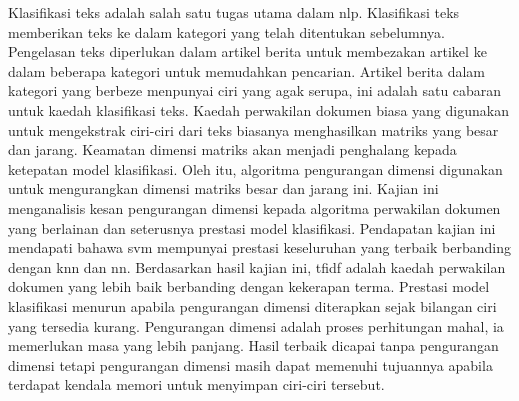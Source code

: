 Klasifikasi teks adalah salah satu tugas utama dalam \ac{nlp}. Klasifikasi teks memberikan teks ke dalam kategori yang telah ditentukan sebelumnya. Pengelasan teks diperlukan dalam artikel berita untuk membezakan artikel ke dalam beberapa kategori untuk memudahkan pencarian. Artikel berita dalam kategori yang berbeze menpunyai ciri yang agak serupa, ini adalah satu cabaran untuk kaedah klasifikasi teks. Kaedah perwakilan dokumen biasa yang digunakan untuk mengekstrak ciri-ciri dari teks biasanya menghasilkan matriks yang besar dan jarang. Keamatan dimensi matriks akan menjadi penghalang kepada ketepatan model klasifikasi. Oleh itu, algoritma pengurangan dimensi digunakan untuk mengurangkan dimensi matriks besar dan jarang ini. Kajian ini menganalisis kesan pengurangan dimensi kepada algoritma perwakilan dokumen yang berlainan dan seterusnya prestasi model klasifikasi. Pendapatan kajian ini mendapati bahawa \ac{svm} mempunyai prestasi keseluruhan yang terbaik berbanding dengan \ac{knn} dan \ac{nn}. Berdasarkan hasil kajian ini, \ac{tfidf} adalah kaedah perwakilan dokumen yang lebih baik berbanding dengan kekerapan terma. Prestasi model klasifikasi menurun apabila pengurangan dimensi diterapkan sejak bilangan ciri yang tersedia kurang. Pengurangan dimensi adalah proses perhitungan mahal, ia memerlukan masa yang lebih panjang. Hasil terbaik dicapai tanpa pengurangan dimensi tetapi pengurangan dimensi masih dapat memenuhi tujuannya apabila terdapat kendala memori untuk menyimpan ciri-ciri tersebut.
